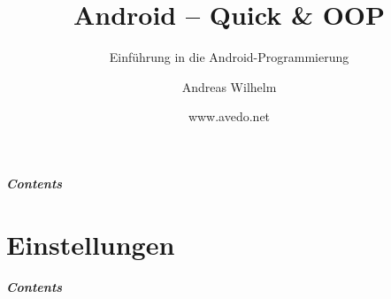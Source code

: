 \title{Android -- Quick \& OOP}
\subtitle{Einführung in die Android-Programmierung}
\author[A. Wilhelm]{Andreas Wilhelm}
\titlegraphic{}
\date{www.avedo.net}

\begin{frame}[plain]
  \titlepage
\end{frame}

\section[Contents]{}
\begin{frame}
	\frametitle{Contents}
	\tableofcontents[onlyparts]
\end{frame}

\part{Einstellungen}
\frame{\partpage}
\begin{frame}
	\frametitle{Contents}
	\tableofcontents[]
\end{frame}


